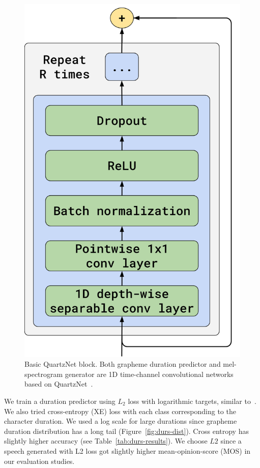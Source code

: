 \begin{figure}[!ht]
\centering
\includegraphics[width=0.8\linewidth]{images/qn-block.png}
\caption{Basic QuartzNet block. Both grapheme duration predictor and mel-spectrogram generator are 1D time-channel convolutional networks based on QuartzNet~\cite{quartznet}.}
\label{fig:qn-block}
\end{figure}

We train a duration predictor using $L_2$ loss with logarithmic targets, similar to~\cite{fastspeech}. We also tried cross-entropy (XE) loss with each class corresponding to the character duration. We used a log scale for large durations since grapheme duration distribution has a long tail (Figure~\ref{fig:durs-dist}). Cross entropy has slightly higher accuracy (see Table~\ref{tab:durs-results}). We choose $L2$ since a speech generated with L2 loss got slightly higher mean-opinion-score (MOS) in our evaluation studies.

